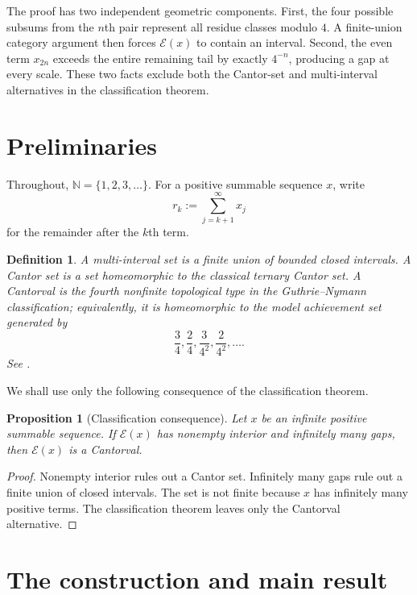 \documentclass[11pt,letterpaper]{article}
\theoremstyle{metriqthm}
\newtheorem{proposition}[theorem]{Proposition}
\theoremstyle{metriqdef}
\newtheorem{definition}[theorem]{Definition}
\newcommand{\E}{\mathcal{E}}
\newcommand{\N}{\mathbb{N}}
\begin{document}
The proof has two independent geometric components. First, the four possible subsums from the $n$th pair represent all residue classes modulo $4$. A finite-union category argument then forces $\E(x)$ to contain an interval. Second, the even term $x_{2n}$ exceeds the entire remaining tail by exactly $4^{-n}$, producing a gap at every scale. These two facts exclude both the Cantor-set and multi-interval alternatives in the classification theorem.

\section{Preliminaries}

Throughout, $\N=\{1,2,3,\ldots\}$. For a positive summable sequence $x$, write
\begin{equation}\label{eq:remainder}
  r_k:=\sum_{j=k+1}^{\infty}x_j
\end{equation}
for the remainder after the $k$th term.

\begin{definition}
A \emph{multi-interval set} is a finite union of bounded closed intervals. A \emph{Cantor set} is a set homeomorphic to the classical ternary Cantor set. A \emph{Cantorval} is the fourth nonfinite topological type in the Guthrie--Nymann classification; equivalently, it is homeomorphic to the model achievement set generated by
\[
  \frac{3}{4},\frac{2}{4},\frac{3}{4^2},\frac{2}{4^2},\ldots.
\]
See \cite{GuthrieNymann1988,NymannSaenz2000,MendesOliveira1994}.
\end{definition}

We shall use only the following consequence of the classification theorem.

\begin{proposition}[Classification consequence]\label{prop:classification-consequence}
Let $x$ be an infinite positive summable sequence. If $\E(x)$ has nonempty interior and infinitely many gaps, then $\E(x)$ is a Cantorval.
\end{proposition}

\begin{proof}
Nonempty interior rules out a Cantor set. Infinitely many gaps rule out a finite union of closed intervals. The set is not finite because $x$ has infinitely many positive terms. The classification theorem leaves only the Cantorval alternative.
\end{proof}

\section{The construction and main result}
\end{document}
